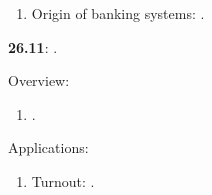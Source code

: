 \documentclass[letterpaper]{article}
\renewenvironment{itemize}{
  \begin{list}{}{
    \setlength{\leftmargin}{1.5em}
  }
}{
  \end{list}
}
\begin{document}
\begin{enumerate}
\begin{itemize}
\begin{enumerate}

          \item[$\bullet$] Origin of banking systems: \href{https://search.ebscohost.com/login.aspx?direct=true&db=nlebk&AN=516924&site=ehost-live&scope=site&ebv=EB&ppid=pp_88}{}.


         \end{enumerate}

       
      \end{itemize}

 \item {\bf 26.11}:  {\color{ForestGreen}{\bf Field Experiments}}.


      \begin{itemize} 

        \item[$\diamond$] Overview:

        \begin{enumerate}

            \item[$\bullet$] \href{https://github.com/hbahamonde/Exp_Soc_Science/raw/c674cb87e82355ba4e1bed84086718605fb1fa3a/Lectures/Readings/Gerber_Green_Ch1.pdf}{}.

          \end{enumerate}

       \item[$\diamond$] Applications:

         \begin{enumerate}


            \item[$\bullet$] Turnout: \href{https://utuvolter.fi/permalink/358FIN_UTUR/1rsgc7g/cdi_proquest_miscellaneous_60710543}{}.


\end{enumerate}
\end{itemize}
\end{enumerate}
\end{document}
